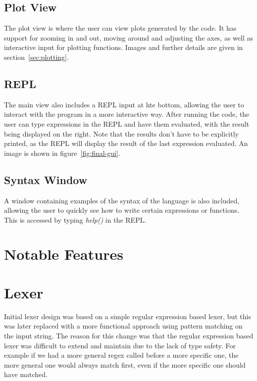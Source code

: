 \subsection{Plot View}\label{subsec:plot-view}

The plot view is where the user can view plots generated by the code.
It has support for zooming in and out, moving around and adjusting the axes, as well as interactive input for
plotting functions.
Images and further details are given in section~\ref{sec:plotting}.

\subsection{REPL}\label{subsec:repl}

The main view also includes a REPL input at hte bottom, allowing the user to interact with the program in a more
interactive way.
After running the code, the user can type expressions in the REPL and have them evaluated, with the result being
displayed on the right.
Note that the results don't have to be explicitly printed, as the REPL will display the result of the last expression
evaluated.
An image is shown in figure~\ref{fig:final-gui}.

\subsection{Syntax Window}\label{subsec:syntax-window}

A window containing examples of the syntax of the language is also included, allowing the user to quickly see how to
write certain expressions or functions.
This is accessed by typing \textit{help()} in the REPL\@.

\section{Notable Features}\label{sec:notable-features}



\section{Lexer}\label{sec:lexer}

Initial lexer design was based on a simple regular expression based lexer, but this was later replaced with a more
functional approach using pattern matching on the input string.
The reason for this change was that the regular expression based lexer was difficult to extend and maintain due to 
the lack of type safety.
For example if we had a more general regex called before a more specific one, the more general one would always match
first, even if the more specific one should have matched.

